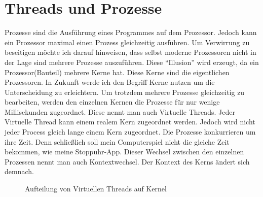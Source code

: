 \section{Threads und Prozesse}
Prozesse sind die Ausführung eines Programmes auf dem Prozessor. Jedoch kann ein Prozessor maximal einen Prozess gleichzeitig ausführen. Um Verwirrung zu beseitigen möchte ich darauf hinweisen, dass selbst moderne Prozessoren nicht in der Lage sind mehrere Prozesse auszuführen. Diese ``Illusion'' wird erzeugt, da ein Prozessor(Bauteil) mehrere Kerne hat. Diese Kerne sind die eigentlichen Prozessoren. In Zukunft werde ich den Begriff Kerne nutzen um die Unterscheidung zu erleichtern. Um trotzdem mehrere Prozesse gleichzeitig zu bearbeiten, werden den einzelnen Kernen die Prozesse für nur wenige Millisekunden zugeordnet. Diese nennt man auch Virtuelle Threads. Jeder Virtuelle Thread kann einem realem Kern zugeordnet werden. Jedoch wird nicht jeder Process gleich lange einem Kern zugeordnet. Die Prozesse konkurrieren um ihre Zeit. Denn schließlich soll mein Computerspiel nicht die gleiche Zeit bekommen, wie meine Stoppuhr-App. Dieser Wechsel zwischen den einzelnen Prozessen nennt man auch Kontextwechsel. Der Kontext des Kerns ändert sich demnach.

\begin{figure}[h]
    \centering
    \caption{Aufteilung von Virtuellen Threads auf Kernel}
\end{figure}

